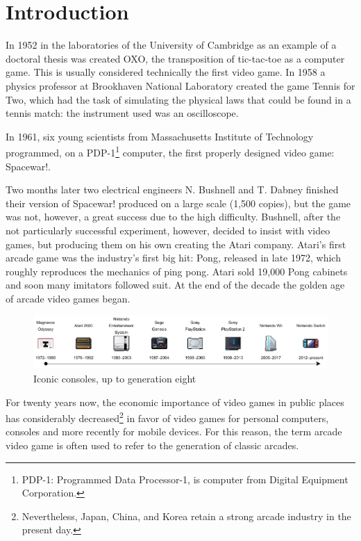 \chapter{Introduction}
\label{cap:introduction}

In 1952 in the laboratories of the University of Cambridge as an example of a doctoral thesis was created OXO, the transposition of tic-tac-toe as a computer game. This is usually considered technically the first video game. In 1958 a physics professor at Brookhaven National Laboratory created the game Tennis for Two, which had the task of simulating the physical laws that could be found in a tennis match: the instrument used was an oscilloscope.

In 1961, six young scientists from Massachusetts Institute of Technology programmed, on a PDP-1\footnote{PDP-1: Programmed Data Processor-1, is computer from Digital Equipment Corporation.} computer, the first properly designed video game: Spacewar!.

Two months later two electrical engineers N. Bushnell and T. Dabney finished their version of Spacewar! produced on a large scale (1,500 copies), but the game was not, however, a great success due to the high difficulty. Bushnell, after the not particularly successful experiment, however, decided to insist with video games, but producing them on his own creating the Atari company. Atari's first arcade game was the industry's first big hit: Pong, released in late 1972, which roughly reproduces the mechanics of ping pong. Atari sold 19,000 Pong cabinets and soon many imitators followed suit. At the end of the decade the golden age of arcade video games began.

\begin{figure}[H]
	\includegraphics[width=\linewidth]{immagini/consoles_history}
	\caption{Iconic consoles, up to generation eight}
	\label{fig:consoles_history}
\end{figure}

For twenty years now, the economic importance of video games in public places has considerably decreased\footnote{Nevertheless, Japan, China, and Korea retain a strong arcade industry in the present day.} in favor of video games for personal computers, consoles and more recently for mobile devices. For this reason, the term arcade video game is often used to refer to the generation of classic arcades\cite{High_Score}.


